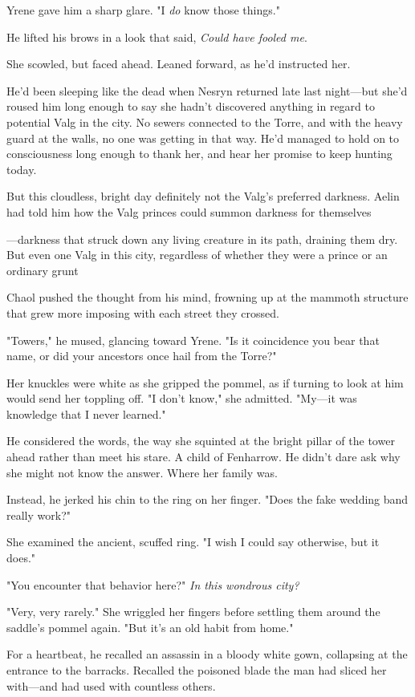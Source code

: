 Yrene gave him a sharp glare. "I \emph{do} know those things."

He lifted his brows in a look that said, \emph{Could have fooled me}.

She scowled, but faced ahead. Leaned forward, as he'd instructed her.

He'd been sleeping like the dead when Nesryn returned late last night---but she'd roused him long enough to say she hadn't discovered anything in regard to potential Valg in the city. No sewers connected to the Torre, and with the heavy guard at the walls, no one was getting in that way. He'd managed to hold on to consciousness long enough to thank her, and hear her promise to keep hunting today.

But this cloudless, bright day  definitely not the Valg's preferred darkness. Aelin had told him how the Valg princes could summon darkness for themselves

---darkness that struck down any living creature in its path, draining them dry. But even one Valg in this city, regardless of whether they were a prince or an ordinary grunt 

Chaol pushed the thought from his mind, frowning up at the mammoth structure that grew more imposing with each street they crossed.

"Towers," he mused, glancing toward Yrene. "Is it coincidence you bear that name, or did your ancestors once hail from the Torre?"

Her knuckles were white as she gripped the pommel, as if turning to look at him would send her toppling off. "I don't know," she admitted. "My---it was knowledge that I never learned."

He considered the words, the way she squinted at the bright pillar of the tower ahead rather than meet his stare. A child of Fenharrow. He didn't dare ask why she might not know the answer. Where her family was.

Instead, he jerked his chin to the ring on her finger. "Does the fake wedding band really work?"

She examined the ancient, scuffed ring. "I wish I could say otherwise, but it does."

"You encounter that behavior here?" \emph{In this wondrous city?}

"Very, very rarely." She wriggled her fingers before settling them around the saddle's pommel again. "But it's an old habit from home."

For a heartbeat, he recalled an assassin in a bloody white gown, collapsing at the entrance to the barracks. Recalled the poisoned blade the man had sliced her with---and had used with countless others.

